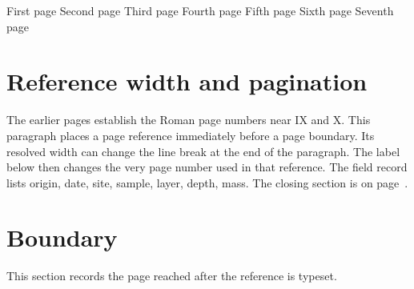 \documentclass{article}
\begin{document}

First page\clearpage
Second page\clearpage
Third page\clearpage
Fourth page\clearpage
Fifth page\clearpage
Sixth page\clearpage
Seventh page\clearpage

\section{Reference width and pagination}
The earlier pages establish the Roman page numbers near IX and X.
This paragraph places a page reference immediately before a page boundary.
Its resolved width can change the line break at the end of the paragraph.
The label below then changes the very page number used in that reference.
The field record lists origin, date, site, sample, layer, depth, mass. The closing section is on page~\pageref{sec:boundary}.

\vspace{14.2cm}

\section{Boundary}\label{sec:boundary}
This section records the page reached after the reference is typeset.
\end{document}
